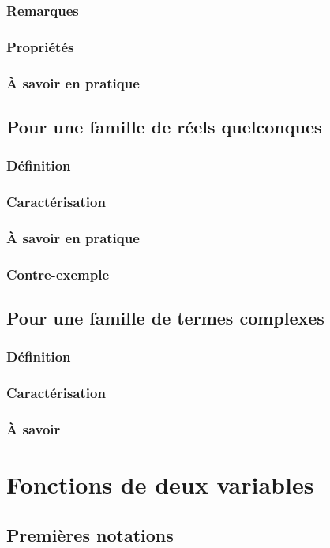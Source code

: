 \documentclass[12pt,a4paper,french]{book}
\begin{document}
		\subsection{Remarques}
		\subsection{Propriétés}
		\subsection{À savoir en pratique}
	\section{Pour une famille de réels quelconques}
		\subsection{Définition}
		\subsection{Caractérisation}
		\subsection{À savoir en pratique}
		\subsection{Contre-exemple}
	\section{Pour une famille de termes complexes}
		\subsection{Définition}
		\subsection{Caractérisation}
		\subsection{À savoir}
		
\chapter{Fonctions de deux variables}
	\section{Premières notations}
\end{document}
